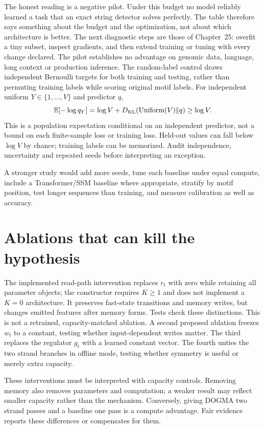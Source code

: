 The honest reading is a negative pilot. Under this budget no model reliably learned a
task that an exact string detector solves perfectly. The table therefore says something
about the budget and the optimization, not about which architecture is better. The next
diagnostic steps are those of Chapter~25: overfit a tiny subset, inspect gradients, and
then extend training or tuning with every change declared. The pilot establishes no
advantage on genomic data, language, long context or production inference. The random-label control draws independent Bernoulli
targets for both training and testing, rather than permuting training labels
while scoring original motif labels. For independent uniform
$Y\in\{1,\ldots,V\}$ and predictor $q$,
\begin{equation}
 \mathbb E[-\log q_Y]=\log V+
 D_{\rm KL}(\operatorname{Uniform}(V)\Vert q)\ge\log V.
 \label{evod22:random}
\end{equation}
This is a population expectation conditional on an independent predictor,
not a bound on each finite-sample loss or training loss. Held-out values can
fall below $\log V$ by chance; training labels can be memorized. Audit
independence, uncertainty and repeated seeds before interpreting an exception.

A stronger study would add more seeds, tune each baseline under equal compute,
include a Transformer/SSM baseline where appropriate, stratify by motif position,
test longer sequences than training, and measure calibration as well as accuracy.

\section{Ablations that can kill the hypothesis}

The implemented read-path intervention replaces $r_t$ with zero while retaining
all parameter objects; the constructor requires $K\ge1$ and does not implement
a $K=0$ architecture. It preserves fast-state transitions and memory writes,
but changes emitted features after memory forms. Tests check these distinctions.
This is not a retrained, capacity-matched ablation. A second proposed ablation
freezes $w_t$ to a constant, testing whether input-dependent writes matter. The third
replaces the regulator $g_t$ with a learned constant vector. The fourth unties the
two strand branches in offline mode, testing whether symmetry is useful or merely
extra capacity.

These interventions must be interpreted with capacity controls. Removing memory
also removes parameters and computation; a weaker result may reflect smaller
capacity rather than the mechanism. Conversely, giving DOGMA two strand passes and
a baseline one pass is a compute advantage. Fair evidence reports these differences
or compensates for them.

